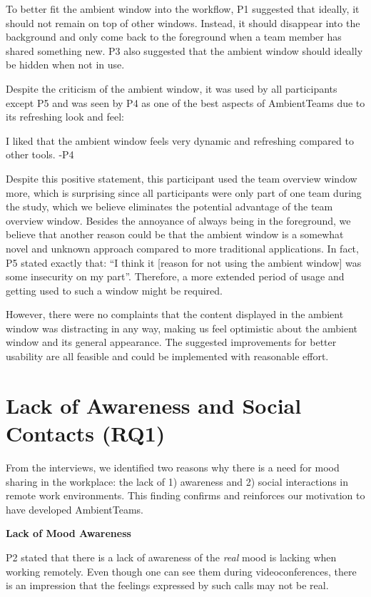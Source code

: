 To better fit the ambient window into the workflow, P1 suggested that ideally, it should not remain on top of other windows. Instead, it should disappear into the background and only come back to the foreground when a team member has shared something new. P3 also suggested that the ambient window should ideally be hidden when not in use.

Despite the criticism of the ambient window, it was used by all participants except P5 and was seen by P4 as one of the best aspects of AmbientTeams due to its refreshing look and feel:

\begin{displayquote}
    I liked that the ambient window feels very dynamic and refreshing compared to other tools. -P4
\end{displayquote}

Despite this positive statement, this participant used the team overview window more, which is surprising since all participants were only part of one team during the study, which we believe eliminates the potential advantage of the team overview window. Besides the annoyance of always being in the foreground, we believe that another reason could be that the ambient window is a somewhat novel and unknown approach compared to more traditional applications. In fact, P5 stated exactly that: \enquote{I think it [reason for not using the ambient window] was some insecurity on my part}. Therefore, a more extended period of usage and getting used to such a window might be required.

However, there were no complaints that the content displayed in the ambient window was distracting in any way, making us feel optimistic about the ambient window and its general appearance. The suggested improvements for better usability are all feasible and could be implemented with reasonable effort.

\section{Lack of Awareness and Social Contacts (RQ1)}
From the interviews, we identified two reasons why there is a need for mood sharing in the workplace: the lack of 1) awareness and 2) social interactions in remote work environments. This finding confirms and reinforces our motivation to have developed AmbientTeams.

\bigskip\noindent\textbf{Lack of Mood Awareness}

\medskip\noindent P2 stated that there is a lack of awareness of the \textit{real} mood is lacking when working remotely. Even though one can see them during videoconferences, there is an impression that the feelings expressed by such calls may not be real.

